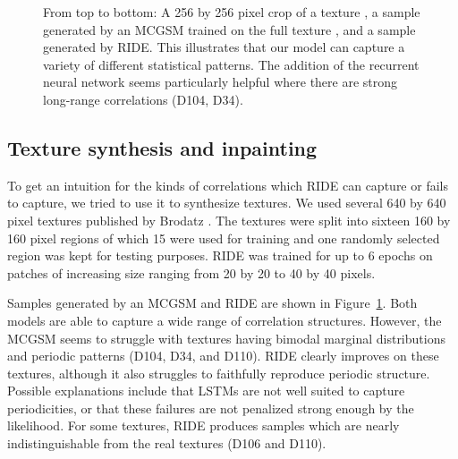 \documentclass{article}
\begin{document}
\begin{figure}[t]

 			\vspace{-.25cm}
			\caption{From top to bottom: A 256 by 256 pixel crop of
				a texture \cite{Brodatz:1966}, a sample generated by an MCGSM trained on the
				full texture \cite{Gerhard:2015}, and a sample generated by RIDE. This
				illustrates that our model can capture a variety of different statistical
				patterns. The addition of the recurrent neural network seems particularly
			helpful where there are strong long-range correlations (D104, D34).}
			\label{fig:textures}
		\end{figure}

		\subsection{Texture synthesis and inpainting}
		To get an intuition for the kinds of correlations which RIDE
		can capture or fails to capture, we tried to use it to synthesize textures.
		We used several 640 by 640 pixel textures published by Brodatz
		\cite{Brodatz:1966}. The textures were split into sixteen 160 by 160 pixel regions
		of which 15 were used for training and one randomly selected region was kept for testing
		purposes. RIDE was trained for up to 6 epochs on patches of increasing size ranging from
		20 by 20 to 40 by 40 pixels.

		Samples generated by an MCGSM and RIDE are shown in Figure~\ref{fig:textures}.
		Both models are able to capture a wide range of correlation structures.
		However, the MCGSM seems to struggle with textures having bimodal marginal distributions
		and periodic patterns (D104, D34, and D110). RIDE clearly improves on these
		textures, although it also struggles to faithfully reproduce periodic structure. Possible
		explanations include that LSTMs are not well suited to capture periodicities, or that
		these failures are not penalized strong enough by the likelihood.
		For some textures, RIDE produces samples which are nearly indistinguishable from the real
		textures (D106 and D110).
\end{document}
